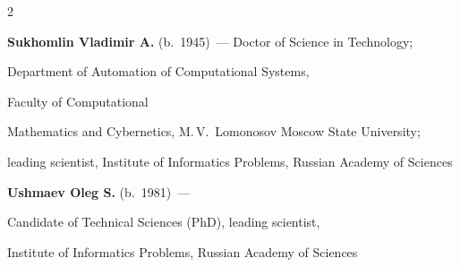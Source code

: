 \begin{multicols}{2}




\vspace*{10pt}

\noindent

\textbf{Sukhomlin Vladimir A.} (b.\ 1945)~--- Doctor of Science in Technology; 

Department of Automation of Computational Systems,

Faculty of  Computational

Mathematics and Cybernetics, M.\,V.~Lomonosov Moscow State University;

leading scientist,  Institute of Informatics Problems,  Russian Academy of Sciences
























\vspace*{10pt}








\noindent %

\textbf{Ushmaev Oleg S.} (b.\ 1981)~---

Candidate of Technical Sciences (PhD), leading scientist,

Institute of Informatics Problems,  Russian Academy of Sciences




\end{multicols}
